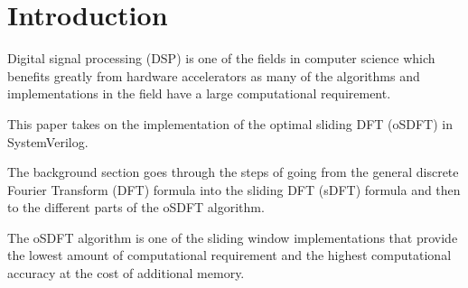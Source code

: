 \documentclass[../main.tex]{subfiles}
\begin{document}
\section{Introduction}%
\label{sec:introduction}

Digital signal processing (DSP) is one of the fields in computer science which benefits greatly from hardware accelerators as many of the algorithms and implementations in the field have a large computational requirement.

This paper takes on the implementation of the optimal sliding DFT (oSDFT) \cite{osdft} in SystemVerilog.

The background section goes through the steps of going from the general discrete Fourier Transform (DFT) formula into the sliding DFT (sDFT) formula and then to the different parts of the oSDFT algorithm.

The oSDFT algorithm is one of the sliding window implementations that provide the lowest amount of computational requirement and the highest computational accuracy at the cost of additional memory.
\end{document}
